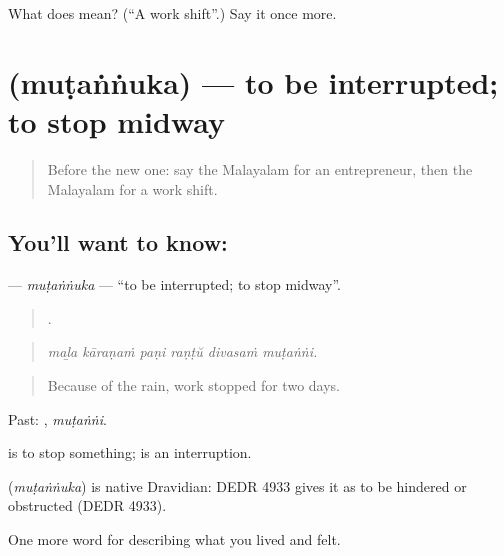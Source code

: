 \begin{tcolorbox}[breakable,colback=teal!4,colframe=teal!35!black,title={Before you move on}]
What does  mean? (\textquotedblleft{}A work shift\textquotedblright{}.) Say it once more.
\end{tcolorbox}
\section[\texorpdfstring{\ml{മുടങ്ങുക} (muṭaṅṅuka)}{മുടങ്ങുക (muṭaṅṅuka)}]{ (muṭaṅṅuka) — to be interrupted; to stop midway}

\label{lesson:ML-C544-mutannuka}



\begin{quote}
Before the new one: say the Malayalam for an entrepreneur, then the Malayalam for a work shift.
\end{quote}

\subsection*{You'll want to know: }
\textbf{} — \emph{muṭaṅṅuka} — \textquotedblleft{}to be interrupted; to stop midway\textquotedblright{}.

\begin{quote}
     .
\end{quote}

\begin{quote}
\emph{maḻa kāraṇaṁ paṇi raṇṭŭ divasaṁ muṭaṅṅi.}
\end{quote}

\begin{quote}
Because of the rain, work stopped for two days.
\end{quote}

Past: , \emph{muṭaṅṅi}.

 is to stop something;  is an interruption.

\begin{cousinweb}
\textbf{} (\emph{muṭaṅṅuka}) is native Dravidian: DEDR 4933 gives it as to be hindered or obstructed (DEDR 4933).
\end{cousinweb}

\begin{grammarlens}[title={What you've built}]
One more word for describing what you lived and felt.
\end{grammarlens}

